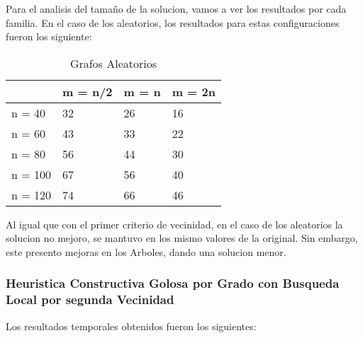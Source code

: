 \newpage
Para el analisis del tamaño de la solucion, vamos a ver los resultados por cada familia. En el caso de los aleatorios, los resultados para estas configuraciones fueron los siguiente:

\begin{table}[H]
\centering
\caption{Grafos Aleatorios}
\label{my-label}
\begin{tabular}{|l|lll|}
\hline
        & \multicolumn{1}{l|}{m = n/2} & \multicolumn{1}{l|}{m = n} & m = 2n \\ \hline
n = 40  & 32                           & 26                         & 16     \\ \cline{1-1}
n = 60  & 43                           & 33                         & 22     \\ \cline{1-1}
n = 80  & 56                           & 44                         & 30     \\ \cline{1-1}
n = 100 & 67                           & 56                         & 40     \\ \cline{1-1}
n = 120 & 74                           & 66                         & 46     \\ \hline
\end{tabular}
\end{table}

Al igual que con el primer criterio de vecinidad, en el caso de los aleatorios la solucion no mejoro, se mantuvo en los mismo valores de la original. Sin embargo, este presento mejoras en los Arboles, dando una solucion menor.

\newpage
\subsubsection{Heuristica Constructiva Golosa por Grado con Busqueda Local por segunda Vecinidad}

Los resultados temporales obtenidos fueron los siguientes:

